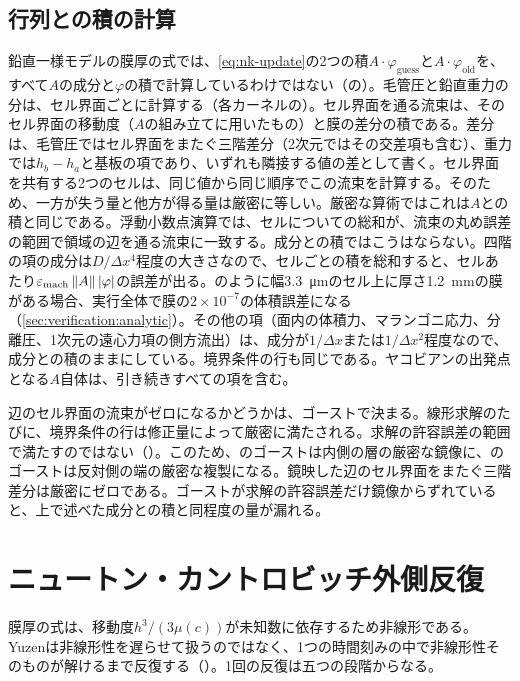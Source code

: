\subsection{行列との積の計算}
\label{sec:time:apply}

鉛直一様モデルの膜厚の式では、\cref{eq:nk-update}の2つの積$A\cdot\varphi_{\mathrm{guess}}$と$A\cdot\varphi_{\mathrm{old}}$を、すべて$A$の成分と$\varphi$の積で計算しているわけではない（の）。毛管圧と鉛直重力の分は、セル界面ごとに計算する（各カーネルの）。セル界面を通る流束は、そのセル界面の移動度（$A$の組み立てに用いたもの）と膜の差分の積である。差分は、毛管圧ではセル界面をまたぐ三階差分（2次元ではその交差項も含む）、重力では$h_b - h_a$と基板の項であり、いずれも隣接する値の差として書く。セル界面を共有する2つのセルは、同じ値から同じ順序でこの流束を計算する。そのため、一方が失う量と他方が得る量は厳密に等しい。厳密な算術ではこれは$A$との積と同じである。浮動小数点演算では、セルについての総和が、流束の丸め誤差の範囲で領域の辺を通る流束に一致する。成分との積ではこうはならない。四階の項の成分は$D/\Delta x^{4}$程度の大きさなので、セルごとの積を総和すると、セルあたり$\varepsilon_{\mathrm{mach}}\,\lVert A\rVert\,\lvert\varphi\rvert$の誤差が出る。のように幅\SI{3.3}{\micro\metre}のセル上に厚さ\SI{1.2}{\milli\metre}の膜がある場合、実行全体で膜の$2\times10^{-7}$の体積誤差になる（\cref{sec:verification:analytic}）。その他の項（面内の体積力、マランゴニ応力、分離圧、1次元の遠心力項の側方流出）は、成分が$1/\Delta x$または$1/\Delta x^{2}$程度なので、成分との積のままにしている。境界条件の行も同じである。ヤコビアンの出発点となる$A$自体は、引き続きすべての項を含む。

辺のセル界面の流束がゼロになるかどうかは、ゴーストで決まる。線形求解のたびに、境界条件の行は修正量によって厳密に満たされる。求解の許容誤差の範囲で満たすのではない（）。このため、のゴーストは内側の層の厳密な鏡像に、のゴーストは反対側の端の厳密な複製になる。鏡映した辺のセル界面をまたぐ三階差分は厳密にゼロである。ゴーストが求解の許容誤差だけ鏡像からずれていると、上で述べた成分との積と同程度の量が漏れる。

\section{ニュートン・カントロビッチ外側反復}
\label{sec:time:newton}

膜厚の式は、移動度$h^{3}/(3\mu(c))$が未知数に依存するため非線形である。Yuzenは非線形性を遅らせて扱うのではなく、1つの時間刻みの中で非線形性そのものが解けるまで反復する（）。1回の反復は五つの段階からなる。

